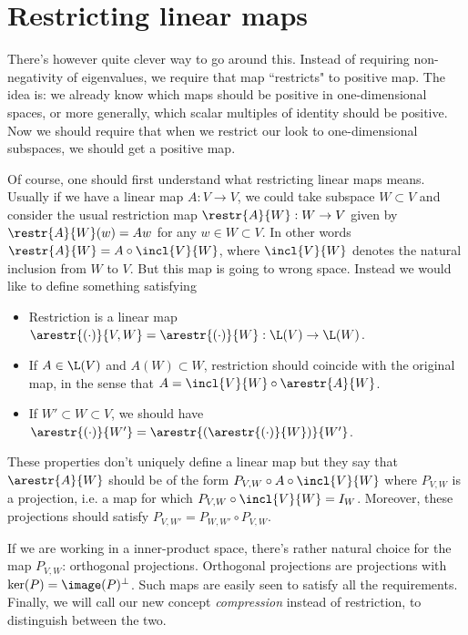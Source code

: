 \section{Restricting linear maps}

There's however quite clever way to go around this. Instead of requiring non-negativity of eigenvalues, we require that map ``restricts" to positive map. The idea is: we already know which maps should be positive in one-dimensional spaces, or more generally, which scalar multiples of identity should be positive. Now we should require that when we restrict our look to one-dimensional subspaces, we should get a positive map.

Of course, one should first understand what restricting linear maps means. Usually if we have a linear map $A : V \to V$, we could take subspace $W \subset V$ and consider the usual restriction map $\restr{A}{W} : W \to V$ given by $\restr{A}{W}(w) = Aw$ for any $w \in W \subset V$. In other words $\restr{A}{W} = A \circ \incl{V}{W}$, where $\incl{V}{W}$ denotes the natural inclusion from $W$ to $V$. But this map is going to wrong space. Instead we would like to define something satisfying
\begin{itemize}
	\item Restriction is a linear map $\arestr{(\cdot)}{V, W} = \arestr{(\cdot)}{W} : \L(V) \to \L(W)$.
	\item If $A \in \L(V)$ and $A(W) \subset W$, restriction should coincide with the original map, in the sense that $A = \incl{V}{W} \circ \arestr{A}{W}$.
	\item If $W' \subset W \subset V$, we should have $\arestr{(\cdot)}{W'} = \arestr{(\arestr{(\cdot)}{W})}{W'}$.
\end{itemize}

These properties don't uniquely define a linear map but they say that $\arestr{A}{W}$ should be of the form $P_{V, W} \circ A \circ \incl{V}{W}$ where $P_{V, W}$ is a projection, i.e. a map for which $P_{V, W} \circ \incl{V}{W} = I_{W}$. Moreover, these projections should satisfy $P_{V, W'} = P_{W, W'} \circ P_{V, W}$.

If we are working in a inner-product space, there's rather natural choice for the map $P_{V, W}$: orthogonal projections. Orthogonal projections are projections with $\ker(P) = \image(P)^{\perp}$. Such maps are easily seen to satisfy all the requirements. Finally, we will call our new concept \textit{compression} instead of restriction, to distinguish between the two.

